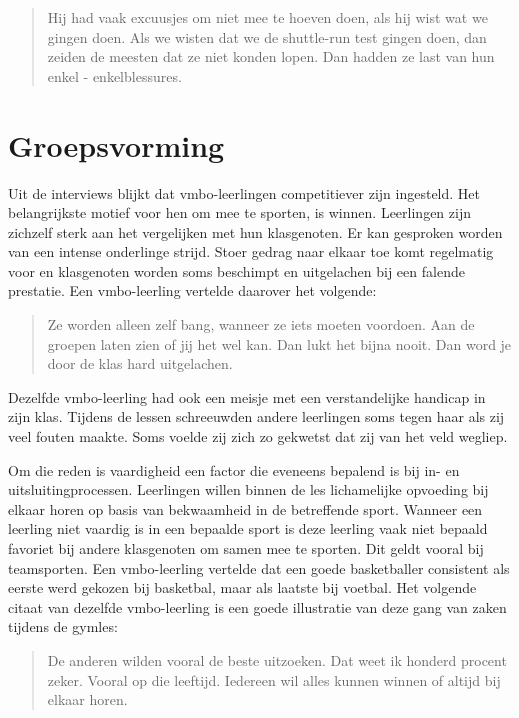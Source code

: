 \documentclass[a4paper,12pt]{memoir}
\begin{document}
\begin{quote}Hij had vaak excuusjes om niet mee te hoeven doen, als hij wist wat we gingen doen. Als we wisten dat we de shuttle-run test gingen doen, dan zeiden de meesten dat ze niet konden lopen. Dan hadden ze last van hun enkel - enkelblessures.\end{quote}

\section{Groepsvorming}

Uit de interviews blijkt dat vmbo-leerlingen competitiever zijn ingesteld. Het belangrijkste motief voor hen om mee te sporten, is winnen. Leerlingen zijn zichzelf sterk aan het vergelijken met hun klasgenoten. Er kan gesproken worden van een intense onderlinge strijd. Stoer gedrag naar elkaar toe komt regelmatig voor en klasgenoten worden soms beschimpt en uitgelachen bij een falende prestatie. Een vmbo-leerling vertelde daarover het volgende:

\begin{quote}Ze worden alleen zelf bang, wanneer ze iets moeten voordoen. Aan de groepen laten zien of jij het wel kan. Dan lukt het bijna nooit. Dan word je door de klas hard uitgelachen.\end{quote}

Dezelfde vmbo-leerling had ook een meisje met een verstandelijke handicap in zijn klas. Tijdens de lessen schreeuwden andere leerlingen soms tegen haar als zij veel fouten maakte. Soms voelde zij zich zo gekwetst dat zij van het veld wegliep.

Om die reden is vaardigheid een factor die eveneens bepalend is bij in- en uitsluitingprocessen. Leerlingen willen binnen de les lichamelijke opvoeding bij elkaar horen op basis van bekwaamheid in de betreffende sport. Wanneer een leerling niet vaardig is in een bepaalde sport is deze leerling vaak niet bepaald favoriet bij andere klasgenoten om samen mee te sporten. Dit geldt vooral bij teamsporten. Een vmbo-leerling vertelde dat een goede basketballer consistent als eerste werd gekozen bij basketbal, maar als laatste bij voetbal. Het volgende citaat van dezelfde vmbo-leerling is een goede illustratie van deze gang van zaken tijdens de gymles:

\begin{quote}De anderen wilden vooral de beste uitzoeken. Dat weet ik honderd procent zeker. Vooral op die leeftijd. Iedereen wil alles kunnen winnen of altijd bij elkaar horen.\end{quote}
\end{document}
